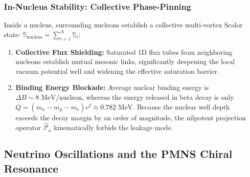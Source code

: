 \documentclass[11pt,a4paper]{article}
\begin{document}
\subsubsection{In-Nucleus Stability: Collective Phase-Pinning}
Inside a nucleus, surrounding nucleons establish a collective multi-vortex Scalor state: $\mathbb{S}_{\mathrm{nucleus}} = \sum_{i=1}^A \mathbb{S}_i$:
\begin{enumerate}
    \item \textbf{Collective Flux Shielding:} Saturated 1D flux tubes from neighboring nucleons establish mutual mesonic links, significantly deepening the local vacuum potential well and widening the effective saturation barrier.
    \item \textbf{Binding Energy Blockade:} Average nuclear binding energy is $\Delta B \sim 8\text{ MeV/nucleon}$, whereas the energy released in beta decay is only $Q = (m_n - m_p - m_e)c^2 \approx 0.782\text{ MeV}$. Because the nuclear well depth exceeds the decay margin by an order of magnitude, the nilpotent projection operator $\hat{\mathcal{P}}_\kappa$ kinematically forbids the leakage mode.
\end{enumerate}

\subsection{Neutrino Oscillations and the PMNS Chiral Resonance}
\label{sec:notrino_pmns_paper4}
\end{document}
